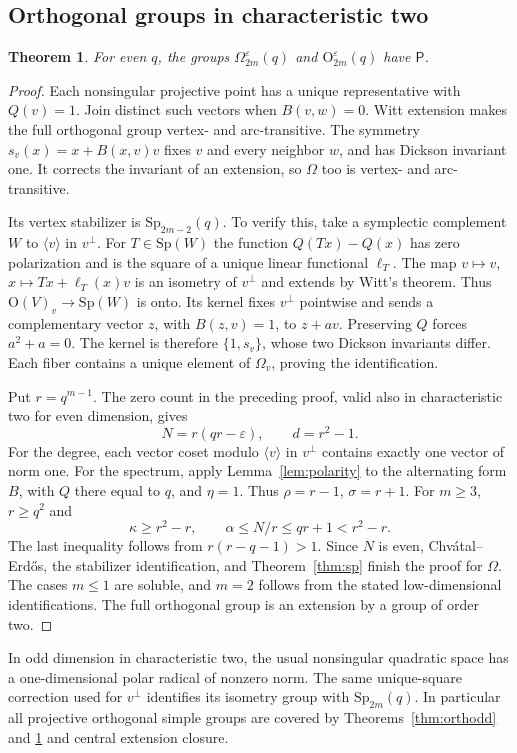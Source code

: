 \documentclass[11pt]{article}
\newtheorem{theorem}{Theorem}[section]
\theoremstyle{definition}
\newcommand{\Pp}{\mathsf P}
\newcommand{\Sp}{\mathrm{Sp}}
\newcommand{\Ogrp}{\mathrm O}
\begin{document}
\subsection{Orthogonal groups in characteristic two}
\begin{theorem}\label{thm:ortheven}
For even $q$, the groups $\Omega_{2m}^{\varepsilon}(q)$ and $\Ogrp_{2m}^{\varepsilon}(q)$ have $\Pp$.
\end{theorem}
\begin{proof}
Each nonsingular projective point has a unique representative with $Q(v)=1$. Join distinct such vectors when $B(v,w)=0$. Witt extension makes the full orthogonal group vertex- and arc-transitive. The symmetry $s_v(x)=x+B(x,v)v$ fixes $v$ and every neighbor $w$, and has Dickson invariant one. It corrects the invariant of an extension, so $\Omega$ too is vertex- and arc-transitive.

Its vertex stabilizer is $\Sp_{2m-2}(q)$. To verify this, take a symplectic complement $W$ to $\langle v\rangle$ in $v^\perp$. For $T\in\Sp(W)$ the function $Q(Tx)-Q(x)$ has zero polarization and is the square of a unique linear functional $\ell_T$. The map $v\mapsto v$, $x\mapsto Tx+\ell_T(x)v$ is an isometry of $v^\perp$ and extends by Witt's theorem. Thus $\Ogrp(V)_v\to\Sp(W)$ is onto. Its kernel fixes $v^\perp$ pointwise and sends a complementary vector $z$, with $B(z,v)=1$, to $z+av$. Preserving $Q$ forces $a^2+a=0$. The kernel is therefore $\{1,s_v\}$, whose two Dickson invariants differ. Each fiber contains a unique element of $\Omega_v$, proving the identification.

Put $r=q^{m-1}$. The zero count in the preceding proof, valid also in characteristic two for even dimension, gives
\[
N=r(qr-\varepsilon),\qquad d=r^2-1.
\]
For the degree, each vector coset modulo $\langle v\rangle$ in $v^\perp$ contains exactly one vector of norm one. For the spectrum, apply Lemma~\ref{lem:polarity} to the alternating form $B$, with $Q$ there equal to $q$, and $\eta=1$. Thus $\rho=r-1$, $\sigma=r+1$. For $m\ge3$, $r\ge q^2$ and
\[
\kappa\ge r^2-r,\qquad \alpha\le N/r\le qr+1<r^2-r.
\]
The last inequality follows from $r(r-q-1)>1$. Since $N$ is even, Chv\'atal--Erd\H{o}s, the stabilizer identification, and Theorem~\ref{thm:sp} finish the proof for $\Omega$. The cases $m\le1$ are soluble, and $m=2$ follows from the stated low-dimensional identifications. The full orthogonal group is an extension by a group of order two.
\end{proof}
In odd dimension in characteristic two, the usual nonsingular quadratic space has a one-dimensional polar radical of nonzero norm. The same unique-square correction used for $v^\perp$ identifies its isometry group with $\Sp_{2m}(q)$. In particular all projective orthogonal simple groups are covered by Theorems~\ref{thm:orthodd} and \ref{thm:ortheven} and central extension closure.
\end{document}
